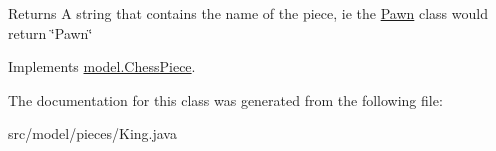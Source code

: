 \begin{DoxyReturn}{Returns}
A string that contains the name of the piece, ie the \hyperlink{classmodel_1_1pieces_1_1_pawn}{Pawn} class would return \char`\"{}\-Pawn\char`\"{} 
\end{DoxyReturn}


Implements \hyperlink{classmodel_1_1_chess_piece_a68308e2fa0fe868f7386d40c6cd925df}{model.\-Chess\-Piece}.



The documentation for this class was generated from the following file\-:\begin{DoxyCompactItemize}
\item 
src/model/pieces/King.\-java\end{DoxyCompactItemize}
